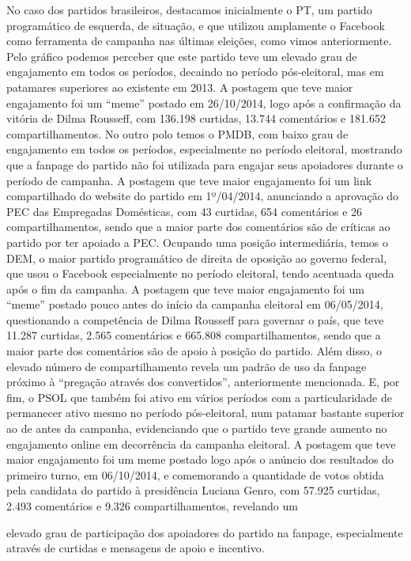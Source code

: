 No caso dos partidos brasileiros, destacamos inicialmente o PT, um
partido programático de esquerda, de situação, e que utilizou amplamente
o Facebook como ferramenta de campanha nas últimas eleições, como vimos
anteriormente. Pelo gráfico podemos perceber que este partido teve um
elevado grau de engajamento em todos os períodos, decaindo no período
pós-eleitoral, mas em patamares superiores ao existente em 2013. A
postagem que teve maior engajamento foi um ``meme'' postado em
26/10/2014, logo após a confirmação da vitória de Dilma Rousseff, com
136.198 curtidas, 13.744 comentários e 181.652 compartilhamentos. No
outro polo temos o PMDB, com baixo grau de engajamento em todos os
períodos, especialmente no período eleitoral, mostrando que a fanpage do
partido não foi utilizada para engajar seus apoiadores durante o período
de campanha. A postagem que teve maior engajamento foi um link
compartilhado do website do partido em 1º/04/2014, anunciando a
aprovação do PEC das Empregadas Domésticas, com 43 curtidas, 654
comentários e 26 compartilhamentos, sendo que a maior parte dos
comentários são de críticas ao partido por ter apoiado a PEC. Ocupando
uma posição intermediária, temos o DEM, o maior partido programático de
direita de oposição ao governo federal, que usou o Facebook
especialmente no período eleitoral, tendo acentuada queda após o fim da
campanha. A postagem que teve maior engajamento foi um ``meme'' postado
pouco antes do início da campanha eleitoral em 06/05/2014, questionando
a competência de Dilma Rousseff para governar o país, que teve 11.287
curtidas, 2.565 comentários e 665.808 compartilhamentos, sendo que a
maior parte dos comentários são de apoio à posição do partido. Além
disso, o elevado número de compartilhamento revela um padrão de uso da
fanpage próximo à ``pregação através dos convertidos'', anteriormente
mencionada. E, por fim, o PSOL que também foi ativo em vários períodos
com a particularidade de permanecer ativo mesmo no período
pós-eleitoral, num patamar bastante superior ao de antes da campanha,
evidenciando que o partido teve grande aumento no engajamento online em
decorrência da campanha eleitoral. A postagem que teve maior engajamento
foi um meme postado logo após o anúncio dos resultados do primeiro
turno, em 06/10/2014, e comemorando a quantidade de votos obtida pela
candidata do partido à presidência Luciana Genro, com 57.925 curtidas,
2.493 comentários e 9.326 compartilhamentos, revelando um

elevado grau de participação dos apoiadores do partido na fanpage,
especialmente através de curtidas e mensagens de apoio e incentivo.

